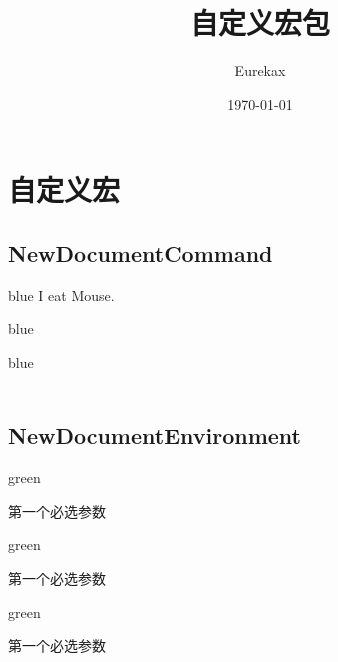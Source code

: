 \documentclass[fontset=windows, 12pt]{article}
\title{自定义宏包}
\author{\calligra Eurekax}
\date{\today}
\newcommand{\baa}[1]{I eat #1{}. }
\begin{document}
\maketitle
\section{自定义宏}

\subsection{NewDocumentCommand}

\begin{formal}[blue!5]{blue}
    \baa{Mouse}\\
\end{formal}

\begin{formal}[blue!5]{blue}
    \\
\end{formal}

\begin{formal}[blue!5]{blue}
    \\
    \\
\end{formal}



\subsection{NewDocumentEnvironment}
\begin{formal}{green}
    \begin{Test}{第一个必选参数}
    \end{Test}
\end{formal}

\begin{formal}{green}
    \begin{Test}[第一个可选参数]{第一个必选参数}
    \end{Test}
\end{formal}

\begin{formal}{green}
    \begin{Test}[][第二个可选参数]{第一个必选参数}
    \end{Test}
\end{formal}
\end{document}
